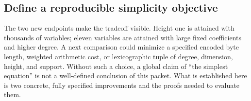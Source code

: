 \subsection{Define a reproducible simplicity objective}

The two new endpoints make the tradeoff visible. Height one is attained
with thousands of variables; eleven variables are attained with large
fixed coefficients and higher degree. A next comparison could minimize
a specified encoded byte length, weighted arithmetic cost, or
lexicographic tuple of degree, dimension, height, and support. Without
such a choice, a global claim of ``the simplest equation'' is not a
well-defined conclusion of this packet. What is established here is
two concrete, fully specified improvements and the proofs needed to
evaluate them.
